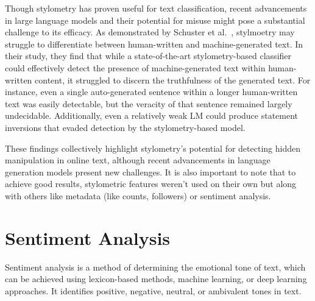 \documentclass[twoside]{ctuthesis}
\theoremstyle{plain}
\theoremstyle{definition}
\theoremstyle{note}
\begin{document}
Though stylometry has proven useful for text classification, recent advancements in large language models and their potential for misuse might pose a substantial challenge to its efficacy. As demonstrated by Schuster et al.~\cite{Schuster2020}, stylmoetry may struggle to differentiate between human-written and machine-generated text. In their study, they find that while a state-of-the-art stylometry-based classifier could effectively detect the presence of machine-generated text within human-written content, it struggled to discern the truthfulness of the generated text. For instance, even a single auto-generated sentence within a longer human-written text was easily detectable, but the veracity of that sentence remained largely undecidable. Additionally, even a relatively weak LM could produce statement inversions that evaded detection by the stylometry-based model.\par

These findings collectively highlight stylometry's potential for detecting hidden manipulation in online text, although recent advancements in language generation models present new challenges. It is also important to note that to achieve good results, stylometric features weren't used on their own but along with others like metadata (like counts, followers) or sentiment analysis. \par

\section{Sentiment Analysis}
Sentiment analysis is a method of determining the emotional tone of text, which can be achieved using lexicon-based methods, machine learning, or deep learning approaches. It identifies positive, negative, neutral, or ambivalent tones in text.\par
\end{document}
